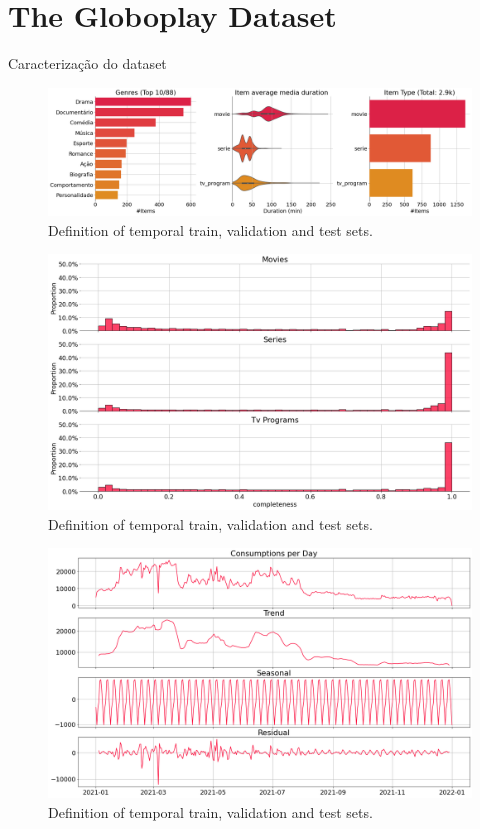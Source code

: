 

\section{The Globoplay Dataset}

Caracterização do dataset

\begin{figure}[h]
    \centering
    \includegraphics[width=\textwidth]{figs/chap5/univariate_distributions.png}
    \caption{Definition of temporal train, validation and test sets.}
    \label{fig:univariate_distribution}
\end{figure}

\begin{figure}[h]
    \centering
    \includegraphics[width=\textwidth]{figs/chap5/completeness_per_title_type.png}
    \caption{Definition of temporal train, validation and test sets.}
    \label{fig:dataset_completeness}
\end{figure}

\begin{figure}[h]
    \centering
    \includegraphics[width=\textwidth]{figs/chap5/time_series_decomposition_7_days.png}
    \caption{Definition of temporal train, validation and test sets.}
    \label{fig:time_series_decomposition}
\end{figure}

